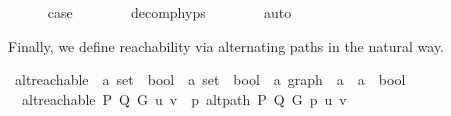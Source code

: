 \begin{isabellebody}
\ \ \ \ \isamarkupfalse%
\ {\isacharquery}{\kern0pt}case\isanewline
\ \ \ \ \ \ \isamarkupfalse%
\ decomp{\isachardot}{\kern0pt}hyps\isanewline
\ \ \ \ \ \ \isamarkupfalse%
\ auto\isanewline
\ \ \isamarkupfalse%
\isanewline
{}\isamarkupfalse%
%
\endisatagproof
{\isafoldproof}%
%
\isadelimproof
%
\endisadelimproof
%
\begin{isamarkuptext}%
Finally, we define reachability via alternating paths in the natural way.%
\end{isamarkuptext}\isamarkuptrue%
\isamarkupfalse%
\ alt{\isacharunderscore}{\kern0pt}reachable\ {\isacharcolon}{\kern0pt}{\isacharcolon}{\kern0pt}\ {\isachardoublequoteopen}{\isacharparenleft}{\kern0pt}{\isacharprime}{\kern0pt}a\ set\ {\isasymRightarrow}\ bool{\isacharparenright}{\kern0pt}\ {\isasymRightarrow}\ {\isacharparenleft}{\kern0pt}{\isacharprime}{\kern0pt}a\ set\ {\isasymRightarrow}\ bool{\isacharparenright}{\kern0pt}\ {\isasymRightarrow}\ {\isacharprime}{\kern0pt}a\ graph\ {\isasymRightarrow}\ {\isacharprime}{\kern0pt}a\ {\isasymRightarrow}\ {\isacharprime}{\kern0pt}a\ {\isasymRightarrow}\ bool{\isachardoublequoteclose}\ \isanewline
\ \ {\isachardoublequoteopen}alt{\isacharunderscore}{\kern0pt}reachable\ P\ Q\ G\ u\ v\ {\isasymequiv}\ {\isasymexists}p{\isachardot}{\kern0pt}\ alt{\isacharunderscore}{\kern0pt}path\ P\ Q\ G\ p\ u\ v{\isachardoublequoteclose}\isanewline
%
\isadelimtheory
\isanewline
%
\endisadelimtheory
%
\isatagtheory
{}\isamarkupfalse%
%
\endisatagtheory
{\isafoldtheory}%
%
\isadelimtheory
%
\endisadelimtheory
%
\end{isabellebody}%
\endinput
